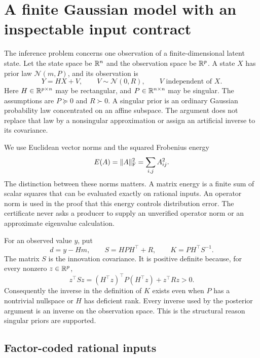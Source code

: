 \section{A finite Gaussian model with an inspectable input contract}
\label{sec:foundation-model}

The inference problem concerns one observation of a finite-dimensional latent state. Let the state space be $\mathbb R^n$ and the observation space be $\mathbb R^p$. A state $X$ has prior law $\mathcal N(m,P)$, and its observation is
\begin{equation}
 Y=HX+V,\qquad V\sim\mathcal N(0,R),\qquad V\text{ independent of }X.
 \label{eq:foundation-model}
\end{equation}
Here $H\in\mathbb R^{p\times n}$ may be rectangular, and $P\in\mathbb R^{n\times n}$ may be singular. The assumptions are $P\succeq0$ and $R\succ0$. A singular prior is an ordinary Gaussian probability law concentrated on an affine subspace. The argument does not replace that law by a nonsingular approximation or assign an artificial inverse to its covariance.

We use Euclidean vector norms and the squared Frobenius energy
\begin{equation}
 E(A)=\lVert A\rVert_{\mathrm F}^2=\sum_{i,j}A_{ij}^2.
 \label{eq:foundation-energy}
\end{equation}
The distinction between these norms matters. A matrix energy is a finite sum of scalar squares that can be evaluated exactly on rational inputs. An operator norm is used in the proof that this energy controls distribution error. The certificate never asks a producer to supply an unverified operator norm or an approximate eigenvalue calculation.

For an observed value $y$, put
\begin{equation}
 d=y-Hm,\qquad S=HPH^\top+R,\qquad K=PH^\top S^{-1}.
 \label{eq:foundation-innovation}
\end{equation}
The matrix $S$ is the innovation covariance. It is positive definite because, for every nonzero $z\in\mathbb R^p$,
\[
 z^\top Sz=(H^\top z)^\top P(H^\top z)+z^\top Rz>0.
\]
Consequently the inverse in the definition of $K$ exists even when $P$ has a nontrivial nullspace or $H$ has deficient rank. Every inverse used by the posterior argument is an inverse on the observation space. This is the structural reason singular priors are supported.

\subsection{Factor-coded rational inputs}

